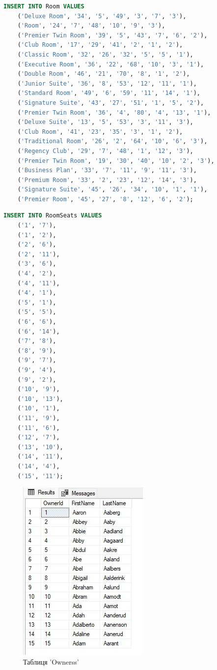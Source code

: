 \documentclass[a4paper,12pt]{article}
\begin{document}
	
	\begin{lstlisting}[language=SQL]
	INSERT INTO Room VALUES
	('Deluxe Room', '34', '5', '49', '3', '7', '3'),
	('Room', '24', '7', '48', '10', '9', '3'),
	('Premier Twin Room', '39', '5', '43', '7', '6', '2'),
	('Club Room', '17', '29', '41', '2', '1', '2'),
	('Classic Room', '32', '26', '32', '5', '5', '1'),
	('Executive Room', '36', '22', '68', '10', '3', '1'),
	('Double Room', '46', '21', '70', '8', '1', '2'),
	('Junior Suite', '36', '8', '53', '12', '11', '1'),
	('Standard Room', '49', '6', '59', '11', '14', '1'),
	('Signature Suite', '43', '27', '51', '1', '5', '2'),
	('Premier Twin Room', '36', '4', '80', '4', '13', '1'),
	('Deluxe Suite', '13', '5', '53', '3', '11', '3'),
	('Club Room', '41', '23', '35', '3', '1', '2'),
	('Traditional Room', '26', '2', '64', '10', '6', '3'),
	('Regency Club', '29', '7', '48', '1', '12', '3'),
	('Premier Twin Room', '19', '30', '40', '10', '2', '3'),
	('Business Plan', '33', '7', '11', '9', '11', '3'),
	('Premium Room', '33', '2', '23', '12', '14', '3'),
	('Signature Suite', '45', '26', '34', '10', '1', '1'),
	('Premier Room', '45', '27', '8', '12', '6', '2');
	\end{lstlisting}
	
	\begin{lstlisting}[language=SQL]
	INSERT INTO RoomSeats VALUES
	('1', '7'), 
	('1', '2'),
	('2', '6'), 
	('2', '11'),
	('3', '6'),
	('4', '2'), 
	('4', '11'), 
	('4', '1'),
	('5', '1'), 
	('5', '5'),
	('6', '6'), 
	('6', '14'), 
	('7', '8'),
	('8', '9'),
	('9', '7'), 
	('9', '4'), 
	('9', '2'),
	('10', '9'), 
	('10', '13'), 
	('10', '1'),
	('11', '9'), 
	('11', '6'), 
	('12', '7'),
	('13', '10'),
	('14', '11'), 
	('14', '4'),
	('15', '11');
	\end{lstlisting}
	
	\begin{figure}[h!]
		\centering
		\begin{minipage}[h]{1\linewidth}
			\includegraphics[width=0.6\linewidth]{Prt sc/Figure_1.jpg}  
		\end{minipage}
		\caption{Таблиця 'Ownerss'}
	\end{figure}
\end{document}

